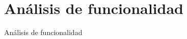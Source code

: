 \section{An\'alisis de funcionalidad}
\label{Analisis_funcionalidad}

An\'alisis de funcionalidad
\par



